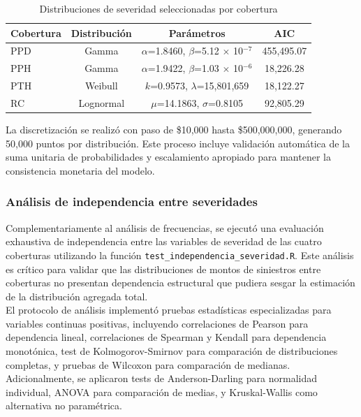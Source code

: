 \begin{table}[H]
\centering
\caption{Distribuciones de severidad seleccionadas por cobertura}
\begin{tabular}{lccc}
\hline
\textbf{Cobertura} & \textbf{Distribución} & \textbf{Parámetros} & \textbf{AIC} \\
\hline
PPD & Gamma & $\alpha$=1.8460, $\beta$=5.12 $\times$ 10$^{-7}$ & 455,495.07 \\
PPH & Gamma & $\alpha$=1.9422, $\beta$=1.03 $\times$ 10$^{-6}$ & 18,226.28 \\
PTH & Weibull & $k$=0.9573, $\lambda$=15,801,659 & 18,122.27 \\
RC & Lognormal & $\mu$=14.1863, $\sigma$=0.8105 & 92,805.29 \\
\hline
\end{tabular}
\end{table}

La discretización se realizó con paso de \$10,000 hasta \$500,000,000, generando 50,000 puntos por distribución. Este proceso incluye validación automática de la suma unitaria de probabilidades y escalamiento apropiado para mantener la consistencia monetaria del modelo.

\subsubsection{Análisis de independencia entre severidades}

Complementariamente al análisis de frecuencias, se ejecutó una evaluación exhaustiva de independencia entre las variables de severidad de las cuatro coberturas utilizando la función \texttt{test\_independencia\_severidad.R}. Este análisis es crítico para validar que las distribuciones de montos de siniestros entre coberturas no presentan dependencia estructural que pudiera sesgar la estimación de la distribución agregada total.\\

El protocolo de análisis implementó pruebas estadísticas especializadas para variables continuas positivas, incluyendo correlaciones de Pearson para dependencia lineal, correlaciones de Spearman y Kendall para dependencia monotónica, test de Kolmogorov-Smirnov para comparación de distribuciones completas, y pruebas de Wilcoxon para comparación de medianas. Adicionalmente, se aplicaron tests de Anderson-Darling para normalidad individual, ANOVA para comparación de medias, y Kruskal-Wallis como alternativa no paramétrica.

